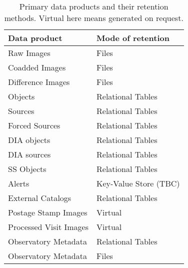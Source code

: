
\begin{table}
\caption{Primary data products and their retention methods. Virtual here means generated on request. \label{tab:prods}}
\begin{center}
\begin{tabular}{|l|l|}\hline
\textbf{Data product}&\textbf{Mode of retention}\\\hline
Raw Images  & Files \\\hline
Coadded Images & Files \\\hline
Difference Images  & Files \\\hline
Objects & Relational Tables \\\hline
Sources  & Relational Tables \\\hline
Forced Sources & Relational Tables \\\hline
DIA objects & Relational Tables \\\hline
DIA sources  & Relational Tables \\\hline
SS Objects  & Relational Tables \\\hline
Alerts & Key-Value Store (TBC) \\\hline
External Catalogs & Relational Tables \\\hline
Postage Stamp Images & Virtual \\\hline
Processed Visit Images & Virtual \\\hline
Observatory Metadata  & Relational Tables \\\hline
Observatory Metadata & Files \\\hline
      \end{tabular}
\end{center}
\end{table}
